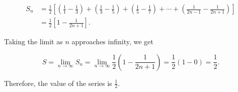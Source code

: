 \begin{align*}
    S_n &= \frac{1}{2} \left[ \left( \frac{1}{1} - \frac{1}{3} \right) + \left( \frac{1}{3} - \frac{1}{5} \right) + \left( \frac{1}{5} - \frac{1}{7} \right) + \cdots + \left( \frac{1}{2n - 1} - \frac{1}{2n + 1} \right) \right] \\
    &= \frac{1}{2} \left[ 1 - \frac{1}{2n + 1} \right].
\end{align*}

Taking the limit as \(n\) approaches infinity, we get

\[
    S = \lim_{n \to \infty} S_n = \lim_{n \to \infty} \frac{1}{2} \left( 1 - \frac{1}{2n + 1} \right) = \frac{1}{2} (1 - 0) = \frac{1}{2}.
\]

Therefore, the value of the series is \(\frac{1}{2}\).
